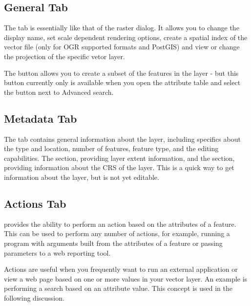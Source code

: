 \subsection{General Tab}\label{vectorgeneraltab}

The  tab is essentially like that of the raster dialog. It
allows you to change the display name, set scale dependent rendering options,
create a spatial index of the vector file (only for OGR supported formats and
PostGIS) and view or change the projection of the specific vetor layer.

The  button allows you to create a subset of the
features in the layer - but this button currently only is available when you
open the attribute table and select the  button next to Advanced
search.

\subsection{Metadata Tab}

The  tab contains general information about the layer,
including specifics about the type and location, number of features, feature
type, and the editing capabilities. The  section,
providing
layer extent information, and the 
section, providing information about the CRS of the layer. This is a quick
way to get information about the layer, but is not yet editable.

\subsection{Actions Tab}\label{label_actions}

\qg provides the ability to perform an action based on the attributes of a
feature. This can be used to perform any number of actions, for example,
running a program with arguments built from the attributes of a feature or
passing parameters to a web reporting tool.

Actions are useful when you frequently want to run an external application or
view a web page based on one or more values in your vector layer. An example
is performing a search based on an attribute value. This concept is used in 
the following discussion.


